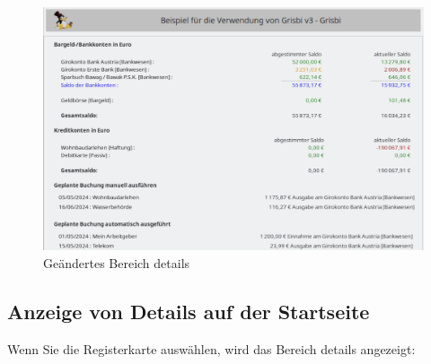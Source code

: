 \begin{figure}[htbp]			%
	\begin{center}
		\includegraphics[width=1\textwidth]{image/screenshot/home_details.png}
	\end{center}
	\caption{Geändertes Bereich details}		%
	\label{home_details}
\end{figure}
 
\subsection{Anzeige von Details auf der Startseite\label{home-details-homepage}}

Wenn Sie die Registerkarte  auswählen, wird das Bereich details angezeigt:%

